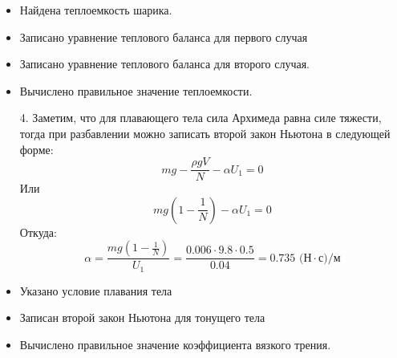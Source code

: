 \additionalCriteria
\begin{itemize}
\item Найдена теплоемкость шарика.
\item Записано уравнение теплового баланса для первого случая
\item Записано уравнение теплового баланса для второго случая.
\item Вычислено правильное значение теплоемкости.
\end{itemize}
\begin{enumerate}
\item [4.] Заметим, что для плавающего тела сила Архимеда равна силе тяжести, тогда при разбавлении можно записать второй закон Ньютона в следующей форме:
$$mg-\frac{\rho gV}{N}-\alpha U_1=0$$
Или
$$mg\left(1-\frac{1}{N}\right)-\alpha U_1=0$$
Откуда:
$$\alpha=\frac{mg\left(1-\frac{1}{N}\right)}{U_1}=\frac{0.006\cdot9.8\cdot0.5}{0.04}=0.735\text{ (Н}\cdot\text{с)/м}$$
\end{enumerate}
\additionalCriteria
\begin{itemize}
\item Указано условие плавания тела
\item Записан второй закон Ньютона для тонущего тела
\item Вычислено правильное значение коэффициента вязкого трения.
\end{itemize}
